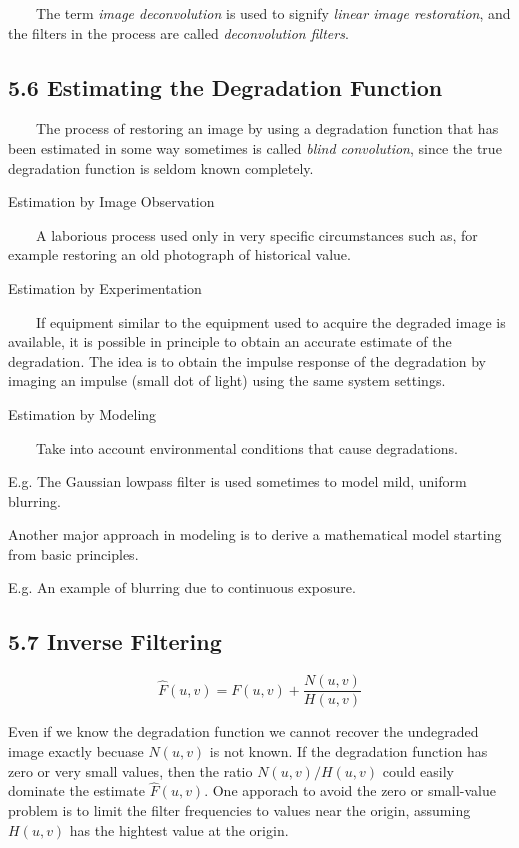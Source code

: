 \documentclass[]{article}
\begin{document}
\(\quad\quad\)The term \emph{image deconvolution} is used to signify
\emph{linear image restoration}, and the filters in the process are
called \emph{deconvolution filters}.

\subsection{5.6 Estimating the Degradation Function}\label{header-n812}

\(\quad\quad\)The process of restoring an image by using a degradation
function that has been estimated in some way sometimes is called
\emph{blind convolution}, since the true degradation function is seldom
known completely.

Estimation by Image Observation

\(\quad\quad\)A laborious process used only in very specific
circumstances such as, for example restoring an old photograph of
historical value.

Estimation by Experimentation

\(\quad\quad\)If equipment similar to the equipment used to acquire the
degraded image is available, it is possible in principle to obtain an
accurate estimate of the degradation. The idea is to obtain the impulse
response of the degradation by imaging an impulse (small dot of light)
using the same system settings.

Estimation by Modeling

\(\quad\quad\)Take into account environmental conditions that cause
degradations.

E.g. The Gaussian lowpass filter is used sometimes to model mild,
uniform blurring.

Another major approach in modeling is to derive a mathematical model
starting from basic principles.

E.g. An example of blurring due to continuous exposure.

\subsection{5.7 Inverse Filtering}\label{header-n830}

\[\hat{F}(u,v)=F(u,v)+\dfrac{N(u,v)}{H(u,v)}\]

Even if we know the degradation function we cannot recover the
undegraded image exactly becuase \(N(u,v)\) is not known. If the
degradation function has zero or very small values, then the ratio
\(N(u,v)/H(u,v)\) could easily dominate the estimate \(\hat{F}(u,v)\).
One apporach to avoid the zero or small-value problem is to limit the
filter frequencies to values near the origin, assuming \(H(u,v)\) has
the hightest value at the origin.
\end{document}
